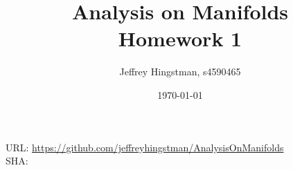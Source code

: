 \documentclass[a4paper, 12pt]{article}
\newcommand{\reponame}{https://github.com/jeffreyhingstman/AnalysisOnManifolds}    %
\begin{document}
	\title{Analysis on Manifolds \\[0.5cm] \large{Homework 1}} 
	\date{\today}
	\author{Jeffrey Hingstman, s4590465}	\maketitle
	\vspace*{\fill}
	\noindent
	URL: \url{\reponame} \\
	SHA: \commithash
	\clearpage
	

	
\end{document}
